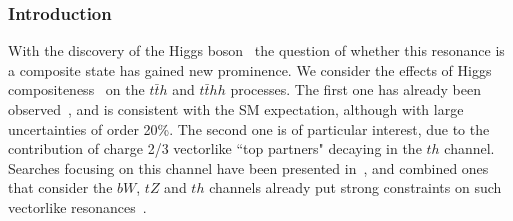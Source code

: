 \subsubsection{Introduction}
With the discovery of the Higgs boson~\cite{Aad:2012tfa,
CMSHiggsJuly2012} the question of whether this resonance is a
composite state has gained new prominence.  We consider the effects of
Higgs compositeness~\cite{Kaplan:1983fs, Kaplan:1983sm, Georgi:1984ef, Georgi:1984af, Dugan:1984hq} on the $t\bar{t}h$ and
$t\bar{t}  h h$ processes.  The first one has already been
observed~\cite{Aaboud:2018urx, Sirunyan:2018hoz}, and is consistent
with the SM expectation, although with large uncertainties of order
20\%.  The second one is of particular interest, due to the contribution of charge 2/3 vectorlike ``top partners" decaying in the $th$ channel. Searches focusing on
this channel have been presented in~\cite{Aaboud:2018xuw}, and
combined ones that consider the $bW$, $tZ$ and $th$ channels
already put strong constraints on such vectorlike
resonances~\cite{Aaboud:2018pii, Sirunyan:2018omb}.

